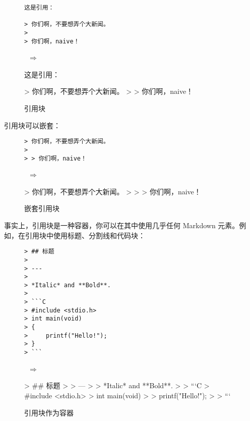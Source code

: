 \documentclass[a4paper,fontset=none]{ctexart}
\begin{document}
\begin{figure}[H]
    \centering
    \begin{minipage}{0.45\textwidth}
        \begin{verbatim}
这是引用：

> 你们啊，不要想弄个大新闻。
>
> 你们啊，naive！
        \end{verbatim}
    \end{minipage}
    \, $\Longrightarrow$ \,
    \begin{minipage}{0.45\textwidth}
\begin{markdown}
这是引用：

> 你们啊，不要想弄个大新闻。
>
> 你们啊，naive！
\end{markdown}
    \end{minipage}
    \caption{引用块}
\end{figure}

引用块可以嵌套：

\begin{figure}[H]
    \centering
    \begin{minipage}{0.45\textwidth}
        \begin{verbatim}
> 你们啊，不要想弄个大新闻。
>
> > 你们啊，naive！
        \end{verbatim}
    \end{minipage}
    \, $\Longrightarrow$ \,
    \begin{minipage}{0.45\textwidth}
\begin{markdown}
> 你们啊，不要想弄个大新闻。
>
> > 你们啊，naive！
\end{markdown}
    \end{minipage}
    \caption{嵌套引用块}
\end{figure}

事实上，引用块是一种容器，你可以在其中使用几乎任何 Markdown 元素。例如，在引用块中使用标题、分割线和代码块：

\begin{figure}[H]
    \centering
    \begin{minipage}{0.45\textwidth}
        \begin{verbatim}
> ## 标题
>
> ---
>
> *Italic* and **Bold**.
>
> ```C
> #include <stdio.h>
> int main(void)
> {
>     printf("Hello!");
> }
> ```
        \end{verbatim}
    \end{minipage}
    \, $\Longrightarrow$ \,
    \begin{minipage}{0.45\textwidth}
\begin{markdown}
> ## 标题
>
> ---
>
> *Italic* and **Bold**.
>
> ```C
> #include <stdio.h>
> int main(void)
> {
>     printf("Hello!");
> }
> ```
\end{markdown}
    \end{minipage}
    \caption{引用块作为容器}
\end{figure}
\end{document}
